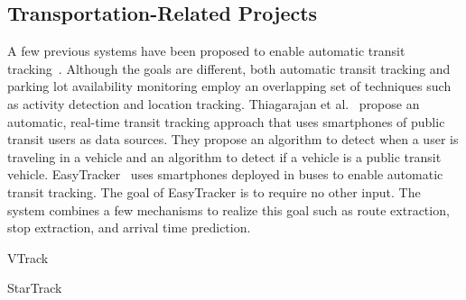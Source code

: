\subsection{Transportation-Related Projects}

A few previous systems have been proposed to enable automatic transit
tracking~\cite{Biagioni:2011:EAT, Thiagarajan:2010:CTT, Zhou:2012:LWP}. Although
the goals are different, both automatic transit tracking and parking lot
availability monitoring employ an overlapping set of techniques such as activity
detection and location tracking. Thiagarajan et al.~\cite{Thiagarajan:2010:CTT}
propose an automatic, real-time transit tracking approach that uses smartphones
of public transit users as data sources. They propose an algorithm to
detect when a user is traveling in a vehicle and an algorithm to detect if a
vehicle is a public transit vehicle. EasyTracker~\cite{Biagioni:2011:EAT} uses
smartphones deployed in buses to enable automatic transit tracking. The goal of
EasyTracker is to require no other input. The system combines a few mechanisms
to realize this goal such as route extraction, stop extraction, and arrival time
prediction.

VTrack~\cite{Thiagarajan:2009:VAE}

StarTrack~\cite{Ananthanarayanan:2009:SFE}

